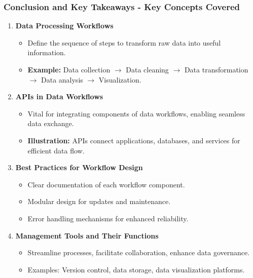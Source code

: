 \documentclass[aspectratio=169]{beamer}
\begin{document}
\begin{frame}[fragile]
    \frametitle{Conclusion and Key Takeaways - Key Concepts Covered}
    \begin{enumerate}
        \item \textbf{Data Processing Workflows}
            \begin{itemize}
                \item Define the sequence of steps to transform raw data into useful information.
                \item \textbf{Example:} Data collection $\rightarrow$ Data cleaning $\rightarrow$ Data transformation $\rightarrow$ Data analysis $\rightarrow$ Visualization.
            \end{itemize}
            
        \item \textbf{APIs in Data Workflows}
            \begin{itemize}
                \item Vital for integrating components of data workflows, enabling seamless data exchange.
                \item \textbf{Illustration:} APIs connect applications, databases, and services for efficient data flow.
            \end{itemize}
        
        \item \textbf{Best Practices for Workflow Design}
            \begin{itemize}
                \item Clear documentation of each workflow component.
                \item Modular design for updates and maintenance.
                \item Error handling mechanisms for enhanced reliability.
            \end{itemize}
        
        \item \textbf{Management Tools and Their Functions}
            \begin{itemize}
                \item Streamline processes, facilitate collaboration, enhance data governance.
                \item Examples: Version control, data storage, data visualization platforms.
            \end{itemize}
    \end{enumerate}
\end{frame}
\end{document}
